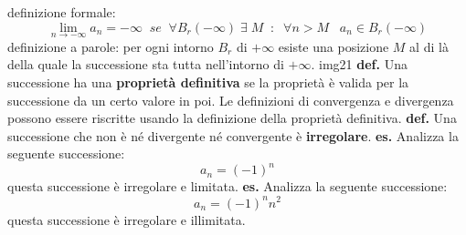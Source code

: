 definizione formale:
\[
    \lim_{n\rightarrow - \infty} a_n = -\infty \;\;se\;\; \forall B_r(-\infty) \;\exists \; M \;\;:\;\; \forall n>M \;\;\; a_n \in B_r(-\infty)
\]
definizione a parole:
\newline
per ogni intorno $B_r$ di $+\infty$ esiste una posizione $M$ al di là della quale la successione sta tutta nell'intorno di $+\infty$.
\newline
img21
\newline
\newline
\newline
\textbf{def.} Una successione ha una \textbf{proprietà definitiva} se la proprietà è valida per la successione da un certo valore in poi.
\newline
\newline
Le definizioni di convergenza e divergenza possono essere riscritte usando la definizione della proprietà definitiva.
\newline
\newline
\newline
\textbf{def.} Una successione che non è né divergente né convergente è \textbf{irregolare}.
\newline
\newline
\newline
\textbf{es.} Analizza la seguente successione:
\[
    a_n = (-1)^n
\]
questa successione è irregolare e limitata.
\newline
\newline
\textbf{es.} Analizza la seguente successione:
\[
    a_n = (-1)^nn^2
\]
questa successione è irregolare e illimitata.
\newpage


